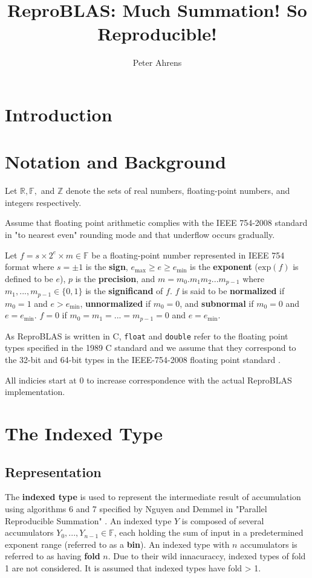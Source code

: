\documentclass[12pt]{article}
\author{Peter Ahrens}
\title{ReproBLAS: Much Summation! So Reproducible!}
\providecommand{\R}{\ensuremath{\mathbb{R}}}
\providecommand{\F}{\ensuremath{\mathbb{F}}}
\providecommand{\Z}{\ensuremath{\mathbb{Z}}}
\providecommand{\exp}{\ensuremath{\text{exp}}}
\providecommand{\min}{\ensuremath{\text{min}}}
\providecommand{\max}{\ensuremath{\text{max}}}
\theoremstyle{plain}
\begin{document}
\noindent
\maketitle
\newpage
\section{Introduction}

\section{Notation and Background}
  Let $\R, \F, $ and $\Z$ denote the sets of real numbers, floating-point numbers, and integers respectively.

  Assume that floating point arithmetic complies with the IEEE 754-2008 standard in "to nearest even" rounding mode and that underflow occurs gradually.

  Let $f = s \times 2^e \times m \in \F$ be a floating-point number represented in IEEE 754 format where $s = \pm 1$ is the \textbf{sign}, $e_{\max} \geq e \geq e_{\min}$ is the \textbf{exponent} ($\exp(f)$ is defined to be $e$), $p$ is the \textbf{precision}, and $m = m_0.m_1m_2...m_{p-1}$ where $m_1, ..., m_{p - 1} \in \{0, 1\}$ is the \textbf{significand} of $f$. $f$ is said to be \textbf{normalized} if $m_0 = 1$ and $e > e_{\min}$, \textbf{unnormalized} if $m_0 = 0$, and \textbf{subnormal} if $m_0 = 0$ and $e = e_{\min}$. $f = 0$ if $m_0 = m_1 = ... = m_{p - 1} = 0$ and $e = e_{\min}$.

  As ReproBLAS is written in C, \verb|float| and \verb|double| refer to the floating point types specified in the 1989 C standard \cite{c89} and we assume that they correspond to the 32-bit and 64-bit types in the IEEE-754-2008 floating point standard \cite{ieee754}. 

  All indicies start at 0 to increase correspondence with the actual ReproBLAS implementation.

\section{The Indexed Type}
  \subsection{Representation}
    The \textbf{indexed type} is used to represent the intermediate result of accumulation using algorithms 6 and 7 specified by Nguyen and Demmel in "Parallel Reproducible Summation" \cite{repsum}.
    An indexed type $Y$ is composed of several accumulators $Y_0, ..., Y_{n - 1} \in \F$, each holding the sum of input in a predetermined exponent range (referred to as a \textbf{bin}). An indexed type with $n$ accumulators is referred to as having \textbf{fold} $n$. Due to their wild innacuraccy, indexed types of fold 1 are not considered. It is assumed that indexed types have fold > 1.
\end{document}
